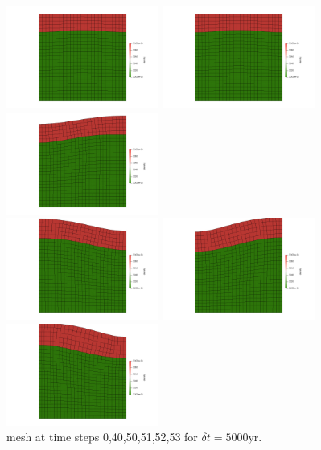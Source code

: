 \begin{center}
\includegraphics[width=5cm]{python_codes/fieldstone_54/images/exp9/rho0000}
\includegraphics[width=5cm]{python_codes/fieldstone_54/images/exp9/rho0040}
\includegraphics[width=5cm]{python_codes/fieldstone_54/images/exp9/rho0050}\\
\includegraphics[width=5cm]{python_codes/fieldstone_54/images/exp9/rho0051}
\includegraphics[width=5cm]{python_codes/fieldstone_54/images/exp9/rho0052}
\includegraphics[width=5cm]{python_codes/fieldstone_54/images/exp9/rho0053}\\
{\captionfont mesh at time steps 0,40,50,51,52,53 for $\delta t=5000$yr.}
\end{center}






